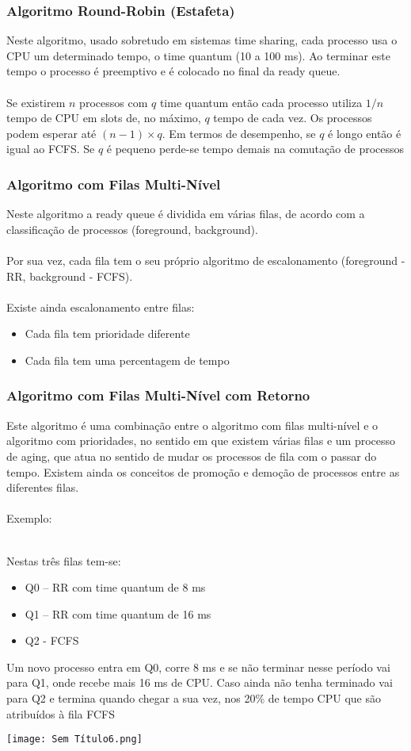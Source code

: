 \documentclass[10pt,a4paper]{report}
\begin{document}
\subsubsection{Algoritmo Round-Robin (Estafeta)}
Neste algoritmo, usado sobretudo em sistemas time sharing, cada processo usa o CPU um determinado tempo, o time quantum (10 a 100 ms). Ao terminar este tempo o processo é preemptivo e é colocado no final da ready queue.\\
\\
Se existirem $n$ processos com $q$ time quantum então cada processo utiliza $1/n$ tempo de CPU em slots de, no máximo, $q$ tempo de cada vez. Os processos podem esperar até $(n-1)\times q$. Em termos de desempenho, se $q$ é longo então é igual ao FCFS. Se $q$ é pequeno perde-se tempo demais na comutação de processos
\subsubsection{Algoritmo com Filas Multi-Nível}
Neste algoritmo a ready queue é dividida em várias filas, de acordo com a classificação de processos (foreground, background).\\
\\
Por sua vez, cada fila tem o seu próprio algoritmo de escalonamento (foreground - RR, background - FCFS).\\
\\
Existe ainda escalonamento entre filas:
\begin{itemize}
\item Cada fila tem prioridade diferente
\item Cada fila tem uma percentagem de tempo
\end{itemize}
\subsubsection{Algoritmo com Filas Multi-Nível com Retorno}
Este algoritmo é uma combinação entre o algoritmo com filas multi-nível e o algoritmo com prioridades, no sentido em que existem várias filas e um processo de aging, que atua no sentido de mudar os processos de fila com o passar do tempo. Existem ainda os conceitos de promoção e demoção de processos entre as diferentes filas.\\
\\
Exemplo:\\
\\
\begin{minipage}[H]{0.7\linewidth}
Nestas três filas tem-se:
\begin{itemize}
\item Q0 – RR com time quantum de 8 ms
\item Q1 – RR com time quantum de 16 ms
\item Q2 - FCFS
\end{itemize}
Um novo processo entra em Q0, corre 8 ms e se não terminar nesse período vai para Q1, onde recebe mais 16 ms de CPU. Caso ainda não tenha terminado vai para Q2 e termina quando chegar a sua vez, nos 20\% de tempo CPU que são atribuídos à fila FCFS
\end{minipage}
\begin{minipage}[c]{0.35\linewidth}
\texttt{[image: Sem Título6.png]}
\end{minipage}
\end{document}
